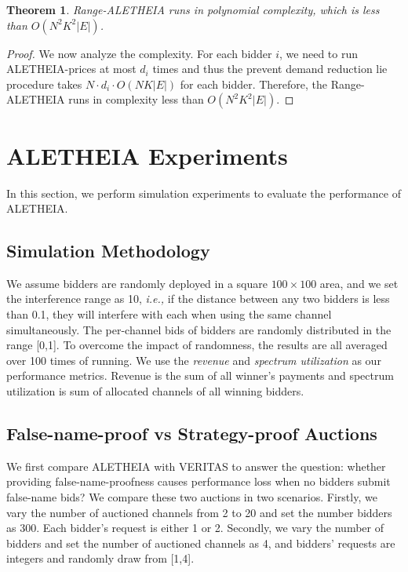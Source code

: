 \documentclass{sig-alternate}
\newtheorem{theorem}{Theorem}
\begin{document}

\begin{theorem}
Range-ALETHEIA runs in polynomial complexity, which is less than $O(N^2K^2|E|)$.
\end{theorem}
\begin{proof}
We now analyze the complexity. For each bidder $i$, we need to run ALETHEIA-prices at most $d_i$ times and thus the prevent demand reduction lie procedure takes $N \cdot d_i\cdot O(NK|E|)$ for each bidder.  Therefore, the Range-ALETHEIA runs in complexity less than $O(N^2K^2|E|)$.
\end{proof}




\section{ALETHEIA Experiments}
In this section, we perform simulation experiments to evaluate the performance of ALETHEIA.

\subsection{Simulation Methodology}
We assume bidders are randomly deployed in a square $100\times 100$ area, and we set the interference range as 10, \emph{i.e.,} if the distance between any two bidders is less than 0.1, they will interfere with each when using the same channel simultaneously. The per-channel bids of bidders are randomly distributed in the range [0,1]. To overcome the impact of randomness, the results are all averaged over 100 times of running. We use the \emph{revenue} and \emph{spectrum utilization} as our performance metrics. Revenue is the sum of all winner's payments and spectrum utilization is sum of allocated channels of all winning bidders.

\subsection{False-name-proof vs Strategy-proof Auctions}
We first compare ALETHEIA with VERITAS to answer the question: whether providing false-name-proofness causes performance loss when no bidders submit false-name bids? We compare these two auctions in two scenarios. Firstly, we vary the number of auctioned channels from 2 to 20 and set the number bidders as 300. Each bidder's request is either 1 or 2.  Secondly, we vary the number of bidders and set the number of auctioned channels as 4, and bidders' requests are integers and randomly draw from [1,4].
\end{document}
